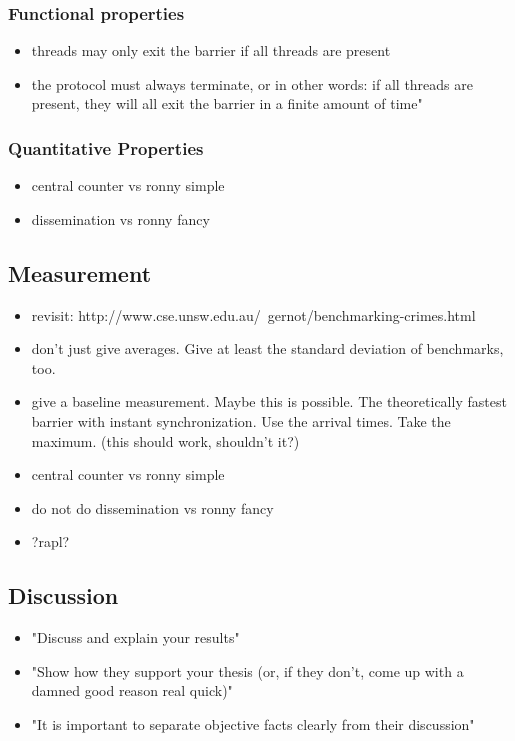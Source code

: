 \documentclass[a4paper, 10pt]{article}
\begin{document}
\begin{enumerate}
\subsubsection{Functional properties}
\label{sssec:analysis-modelchecking-quality}
\begin{itemize}
	\item threads may only exit the barrier if all threads are present
	\item the protocol must always terminate, or in other words: if all threads are present, they will all exit the barrier in a finite amount of time"
\end{itemize}

\subsubsection{Quantitative Properties}
\label{sssec:analysis-modelchecking-quantity}
\begin{itemize}
	\item central counter vs ronny simple
	\item dissemination vs ronny fancy
\end{itemize}

\subsection{Measurement}
\label{ssec:analysis-measurement}
\begin{itemize}
	\item revisit: http://www.cse.unsw.edu.au/~gernot/benchmarking-crimes.html
	\item don't just give averages. Give at least the standard deviation of benchmarks, too.
	\item give a baseline measurement. Maybe this is possible. The theoretically fastest barrier with instant synchronization. Use the arrival times. Take the maximum. (this should work, shouldn't it?)
	\item central counter vs ronny simple
	\item do not do dissemination vs ronny fancy
	\item ?rapl?
\end{itemize}

\subsection{Discussion}
\label{ssec:analysis-discussion}
\begin{itemize}
	\item "Discuss and explain your results"
	\item "Show how they support your thesis (or, if they don't, come up with a damned good reason real quick)"
	\item "It is important to separate objective facts clearly from their discussion"
\end{itemize}


\end{enumerate}
\end{document}
